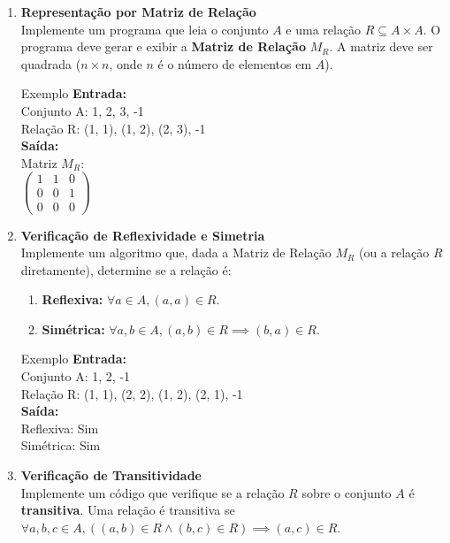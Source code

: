 \documentclass[12pt]{article}
\begin{document}
\vspace{0.4cm}
\begin{enumerate}

\item \textbf{Representação por Matriz de Relação}\\
Implemente um programa que leia o conjunto $A$ e uma relação $R \subseteq A \times A$. O programa deve gerar e exibir a \textbf{Matriz de Relação} $M_R$. A matriz deve ser quadrada ($n \times n$, onde $n$ é o número de elementos em $A$).

\begin{block}{Exemplo}
\textbf{Entrada:} \\
Conjunto A: 1, 2, 3, -1 \\
Relação R: (1, 1), (1, 2), (2, 3), -1 \\
\textbf{Saída:} \\
Matriz $M_R$: \\
$\begin{pmatrix} 1 & 1 & 0 \\ 0 & 0 & 1 \\ 0 & 0 & 0 \end{pmatrix}$
\end{block}

\vspace{0.3cm}
\item \textbf{Verificação de Reflexividade e Simetria}\\
Implemente um algoritmo que, dada a Matriz de Relação $M_R$ (ou a relação $R$ diretamente), determine se a relação é:
\begin{enumerate}[label=\alph*)]
    \item \textbf{Reflexiva:} $\forall a \in A, (a, a) \in R$.
    \item \textbf{Simétrica:} $\forall a, b \in A, (a, b) \in R \implies (b, a) \in R$.
\end{enumerate}

\begin{block}{Exemplo}
\textbf{Entrada:} \\
Conjunto A: 1, 2, -1 \\
Relação R: (1, 1), (2, 2), (1, 2), (2, 1), -1 \\
\textbf{Saída:} \\
Reflexiva: Sim \\
Simétrica: Sim
\end{block}

\vspace{0.3cm}
\item \textbf{Verificação de Transitividade}\\
Implemente um código que verifique se a relação $R$ sobre o conjunto $A$ é \textbf{transitiva}. Uma relação é transitiva se $\forall a, b, c \in A, ((a, b) \in R \land (b, c) \in R) \implies (a, c) \in R$.


\end{enumerate}
\end{document}
